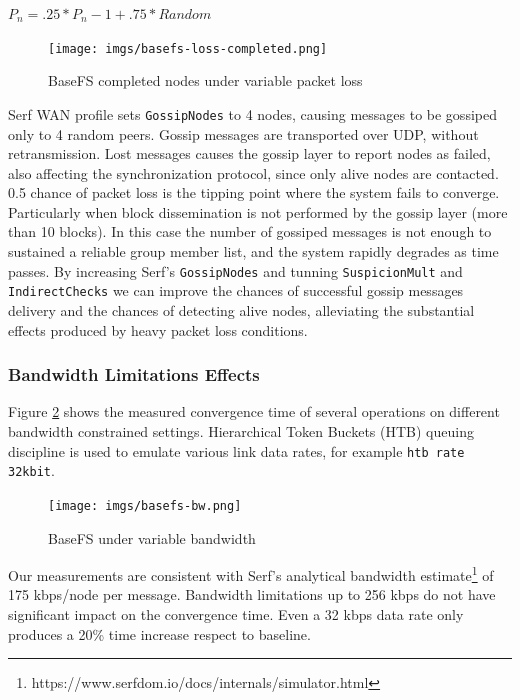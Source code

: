 \documentclass{sig-alternate}
\begin{document}
$P_n = .25 * P_n-1 + .75 * Random$



\begin{figure}
\centering
\texttt{[image: imgs/basefs-loss-completed.png]}
\caption{BaseFS completed nodes under variable packet loss}
\label{fig:basefs-loss-completed}
\end{figure}


Serf WAN profile sets \texttt{GossipNodes} to 4 nodes, causing messages to be gossiped only to 4 random peers. Gossip messages are transported over UDP, without retransmission. Lost messages causes the gossip layer to report nodes as failed, also affecting the synchronization protocol, since only alive nodes are contacted. 0.5 chance of packet loss is the tipping point where the system fails to converge. Particularly when block dissemination is not performed by the gossip layer (more than 10 blocks). In this case the number of gossiped messages is not enough to sustained a reliable group member list, and the system rapidly degrades as time passes. By increasing Serf's \texttt{GossipNodes} and tunning \texttt{SuspicionMult} and \texttt{IndirectChecks} we can improve the chances of successful gossip messages delivery and the chances of detecting alive nodes, alleviating the substantial effects produced by heavy packet loss conditions.


\subsubsection{Bandwidth Limitations Effects}

Figure \ref{fig:basefs-bw} shows the measured convergence time of several operations on different bandwidth constrained settings. Hierarchical Token Buckets (HTB) queuing discipline is used to emulate various link data rates, for example \texttt{htb rate 32kbit}.

\begin{figure}
\centering
\texttt{[image: imgs/basefs-bw.png]}
\caption{BaseFS under variable bandwidth}
\label{fig:basefs-bw}
\end{figure}

Our measurements are consistent with Serf's analytical bandwidth estimate\footnote{https://www.serfdom.io/docs/internals/simulator.html} of 175 kbps/node per message. Bandwidth limitations up to 256 kbps do not have significant impact on the convergence time. Even a 32 kbps data rate only produces a 20\% time increase respect to baseline.
\end{document}
